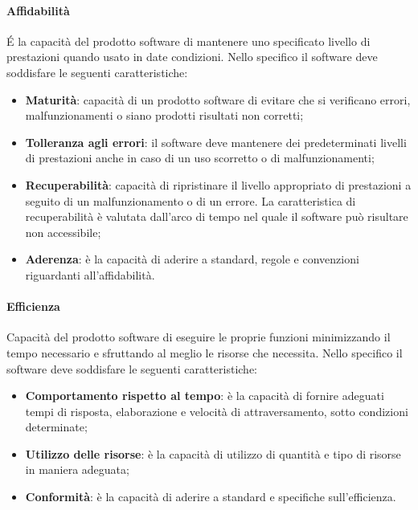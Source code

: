 \paragraph{Affidabilità}
\'E la capacità del prodotto software di mantenere uno specificato livello di prestazioni quando usato in date condizioni. Nello specifico il software deve soddisfare le seguenti caratteristiche:
\begin{itemize}
	\item \textbf{Maturità}: capacità di un prodotto software di evitare che si verificano errori, malfunzionamenti o siano prodotti risultati non corretti;
	\item \textbf{Tolleranza agli errori}: il software deve mantenere dei predeterminati livelli di prestazioni anche in caso di un uso scorretto o di malfunzionamenti;
	\item \textbf{Recuperabilità}: capacità di ripristinare il livello appropriato di prestazioni a seguito di un malfunzionamento o di un errore. La caratteristica di recuperabilità è valutata dall'arco di tempo nel quale il software può risultare non accessibile;
	\item \textbf{Aderenza}: è la capacità di aderire a standard, regole e convenzioni riguardanti all'affidabilità.
\end{itemize}
\paragraph{Efficienza}
Capacità del prodotto software di eseguire le proprie funzioni minimizzando il tempo necessario e sfruttando al meglio le risorse che necessita.
Nello specifico il software deve soddisfare le seguenti caratteristiche:
\begin{itemize}
	\item \textbf{Comportamento rispetto al tempo}: è la capacità di fornire adeguati tempi di risposta, elaborazione e velocità di attraversamento, sotto condizioni determinate;
	\item \textbf{Utilizzo delle risorse}: è la capacità di utilizzo di quantità e tipo di risorse in maniera adeguata;
	\item \textbf{Conformità}: è la capacità di aderire a standard e specifiche sull'efficienza.
\end{itemize}
